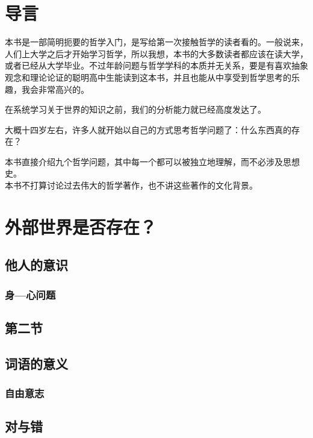 \documentclass{ctexart} %
\begin{document}
	
	\tableofcontents %

	\newpage %
	
	\section{导言}
	本书是一部简明扼要的哲学入门，是写给第一次接触哲学的读者看的。一般说来，人们上大学之后才开始学习哲学，所以我想，本书的大多数读者都应该在读大学，或者已经从大学毕业。不过年龄问题与哲学学科的本质并无关系，要是有喜欢抽象观念和理论论证的聪明高中生能读到这本书，并且也能从中享受到哲学思考的乐趣，我会非常高兴的。
	
	在系统学习关于世界的知识之前，我们的分析能力就已经高度发达了。\par 大概十四岁左右，许多人就开始以自己的方式思考哲学问题了：什么东西真的存在？
	
	本书直接介绍九个哲学问题，其中每一个都可以被独立地理解，而不必涉及思想史。\\本书不打算讨论过去伟大的哲学著作，也不讲这些著作的文化背景。
	
	\section{外部世界是否存在？}
	\subsection{他人的意识}
	\subsubsection{身—心问题} %
	\subsection{第二节}
	\subsection{词语的意义}
	\subsubsection{自由意志}
	\subsection{对与错}
	
\end{document}
